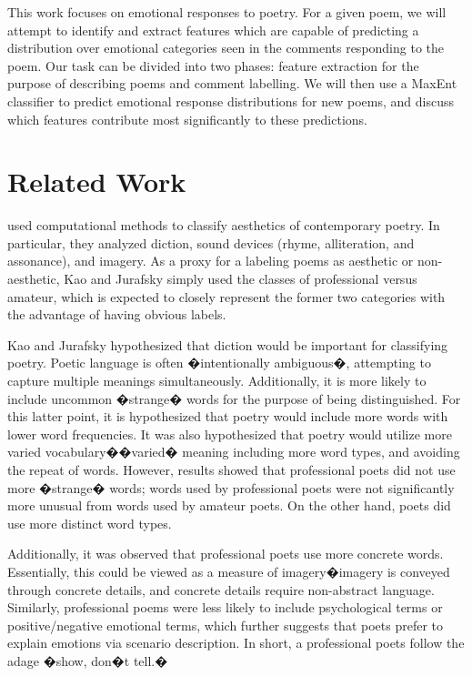 \documentclass[11pt]{article}
\begin{document}
This work focuses on emotional responses to poetry. For a given poem, we will attempt to identify and extract features which are capable of predicting a distribution over emotional categories seen in the comments responding to the poem. Our task can be divided into two phases: feature extraction for the purpose of describing poems and comment labelling. We will then use a MaxEnt classifier to predict emotional response distributions for new poems, and discuss which features contribute most significantly to these predictions.



\section{Related Work}

 used computational methods to classify aesthetics of contemporary poetry. In particular, they analyzed diction, sound devices (rhyme, alliteration, and assonance), and imagery. As a proxy for a labeling poems as aesthetic or non-aesthetic, Kao and Jurafsky simply used the classes of professional versus amateur, which is expected to closely represent the former two categories with the advantage of having obvious labels.

Kao and Jurafsky hypothesized that diction would be important for classifying poetry. Poetic language is often �intentionally ambiguous�, attempting to capture multiple meanings simultaneously. Additionally, it is more likely to include uncommon �strange� words for the purpose of being distinguished. For this latter point, it is hypothesized that poetry would include more words with lower word frequencies. It was also hypothesized that poetry would utilize more varied vocabulary��varied� meaning including more word types, and avoiding the repeat of words. However, results showed that professional poets did not use more �strange� words; words used by professional poets were not significantly more unusual from words used by amateur poets. On the other hand, poets did use more distinct word types.

Additionally, it was observed that professional poets use more concrete words. Essentially, this could be viewed as a measure of imagery�imagery is conveyed through concrete details, and concrete details require non-abstract language. Similarly, professional poems were less likely to include psychological terms or positive/negative emotional terms, which further suggests that poets prefer to explain emotions via scenario description. In short, a professional poets follow the adage �show, don�t tell.�
\end{document}

